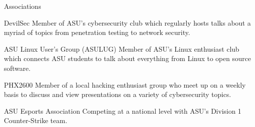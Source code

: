 \documentclass{article}
\newlength{\tabin}
\newlength{\secsep}
\newcommand{\lineunder}{\vspace*{-8pt} \\ \hspace*{-6pt} \hrulefill \\ \vspace*{-15pt}}
\newenvironment{tabbedsection}[1]{
  \begin{list}{}{
      \setlength{\itemsep}{0pt}
      \setlength{\labelsep}{0pt}
      \setlength{\labelwidth}{0pt}
      \setlength{\leftmargin}{\tabin}
      \setlength{\rightmargin}{\tabin}
      \setlength{\listparindent}{0pt}
      \setlength{\parsep}{0pt}
      \setlength{\parskip}{0pt}
      \setlength{\partopsep}{0pt}
      \setlength{\topsep}{#1}
    }
  \item[]
}{\end{list}}
\newenvironment{resume_section}[1]{
  \filbreak
  \vspace{2\secsep}
  \textsc{\large#1}
  \lineunder
  \begin{tabbedsection}{\secsep}
}{\end{tabbedsection}}
\newenvironment{resume_subsection}[2][]{
  \textbf{#2} \hfill {\normalsize #1} \hspace{-5em}
  \begin{tabbedsection}{0.5\secsep}
}{\end{tabbedsection}}
\begin{document}
\begin{resume_section}{Associations}
  	\begin{resume_subsection}{DevilSec}
		Member of ASU's cybersecurity club which regularly hosts talks about a myriad of topics from penetration testing to network security.
  	\end{resume_subsection}
  	\vspace{2\secsep}
  	\begin{resume_subsection}{ASU Linux User's Group (ASULUG)}
  	Member of ASU's Linux enthusiast club which connects ASU students to talk about everything from Linux to open source software.
  	\end{resume_subsection}
  	\vspace{2\secsep}
  	\begin{resume_subsection}{PHX2600}
  	Member of a local hacking enthusiast group who meet up on a weekly basis to discuss and view presentations on a variety of cybersecurity topics.
  	\end{resume_subsection}
  	\vspace{2\secsep}
  	\begin{resume_subsection}{ASU Esports Association}
  		Competing at a national level with ASU's Division 1 Counter-Strike team.
  	\end{resume_subsection}
\end{resume_section}
\end{document}
